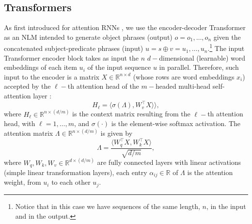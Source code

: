 \documentclass[preprint]{elsarticle}
\begin{document}
\subsection{Transformers}


As first introduced for attention RNNs \cite{luong-etal-2015-effective,bahdanau2015neural}, we use the encoder-decoder Transformer as an NLM intended to generate object phrases (output) $o=o_1,\dots,o_n$ given the concatenated subject-predicate phrases (input) $u=s\oplus v=u_1,\dots,u_n$.\footnote{Notice that in this case we have sequences of the same length, $n$, in the input and in the output.} The input Transformer encoder block takes as input the $n$ $d-$dimensional (learnable) word embeddings of each item $u_i$ of the input sequence $u$ in parallel. Therefore, such input to the encoder is a matrix $X\in\mathbb{R}^{n\times d}$ (whose rows are word embeddings $x_i$) accepted by the $\ell-$th attention head of the $m-$headed multi-head self-attention layer \cite{dutta2021redesigning}:
\begin{equation}
    \label{eq:self_attention}
    H_{\ell}=\langle\sigma(\Lambda),W_v^\top X\rangle\rangle,
    \end{equation}
\noindent where $H_{\ell}\in\mathbb{R}^{n\times (d/m)}$ is the context matrix resulting from the $\ell-$th attention head, with $\ell=1,\dots,m$, and $\sigma(\cdot)$ is the element-wise softmax activation. The attention matrix $\Lambda\in\mathbb{R}^{n\times (d/m)}$ is given by
\begin{equation}
    \label{eq:self_attention_matrix}
    \Lambda=\frac{\langle W_q^\top X,W_k^\top X\rangle}{\sqrt{d/m}},
\end{equation}
\noindent where $W_q,W_k,W_v\in\mathbb{R}^{d\times (d/m)}$ are fully connected layers with linear activations (simple linear transformation layers), each entry $\alpha_{ij}\in\mathbb{R}$ of $\Lambda$ is the attention weight, from $u_i$ to each other $u_j$.
\end{document}
